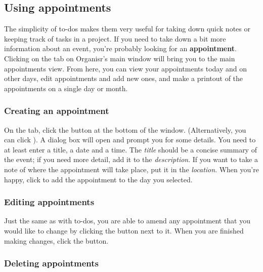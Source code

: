 \subsection{Using appointments}


The simplicity of to-dos makes them very useful for taking down quick notes or
keeping track of tasks in a project. If you need to take down a bit more
information about an event, you're probably looking for an \textbf{appointment}.
Clicking on the  tab on Organisr's main window will bring
you to the main appointments view. From here, you can view your appointments
today and on other days, edit appointments and add new ones, and make a printout
of the appointments on a single day or month.


\subsubsection{Creating an appointment}


On the  tab, click the  button at
the bottom of the window. (Alternatively, you can click ). A dialog box will open and prompt you for some details. You
need to at least enter a title, a date and a time. The \textit{title} should be
a concise summary of the event; if you need more detail, add it to the
\textit{description}. If you want to take a note of where the appointment will
take place, put it in the \textit{location}. When you're happy, click
 to add the appointment to the day you selected.



\subsubsection{Editing appointments}


Just the same as with to-dos, you are able to amend any appointment that you
would like to change by clicking the  button next to it. When you are
finished making changes, click the  button.


\subsubsection{Deleting appointments}

